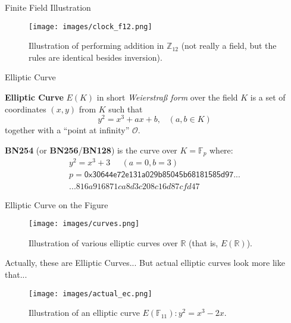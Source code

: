 \documentclass[xcolor={usenames,dvipsnames}]{beamer}
\begin{document}
    \begin{frame}{Finite Field Illustration}
        \begin{figure}
            \centering
            \texttt{[image: images/clock\_f12.png]}
            \caption{Illustration of performing addition in $\mathbb{Z}_{12}$ (not really a field, but the rules are identical besides inversion).}
        \end{figure}
    \end{frame}

    \begin{frame}{Elliptic Curve}	
        \begin{definition}
            \textbf{Elliptic Curve} $E(K)$ in short \textit{Weierstraß form} over the field $K$ is a set of coordinates $(x,y)$ from $K$ such that
            \begin{equation*}
                y^2 = x^3 + ax + b, \;\;\; (a,b \in K)
            \end{equation*}
            together with a ``point at infinity'' $\mathcal{O}$.
        \end{definition}
        \pause
        \textbf{BN254} (or \textbf{BN256}/\textbf{BN128}) is the curve over $K=\mathbb{F}_p$ where:
        \begin{gather*}
            y^2 = x^3 + 3 \;\;\;\;\; (a=0,b=3) \\
            p = \mathsf{0x30644e72e131a029b85045b68181585d97...}\\{...816a916871ca8d3c208c16d87cfd47}
        \end{gather*}
    \end{frame}

    \begin{frame}{Elliptic Curve on the Figure}	
        \begin{figure}
            \centering
            \texttt{[image: images/curves.png]}
            \caption{Illustration of various elliptic curves over $\mathbb{R}$ (that is, $E(\mathbb{R})$).}
        \end{figure}
    \end{frame}

    \begin{frame}{Actually, these are Elliptic Curves...}	
        But actual elliptic curves look more like that...
    
        \begin{figure}
            \centering
            \texttt{[image: images/actual\_ec.png]}
            \caption{Illustration of an elliptic curve $E(\mathbb{F}_{11}): y^2 = x^3 - 2x$.}
        \end{figure}
    \end{frame}
    
\end{document}
